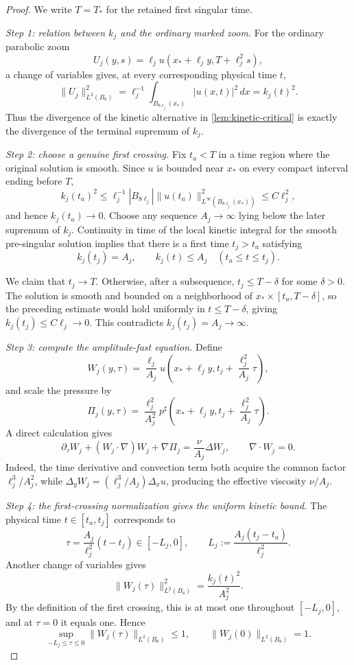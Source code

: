 \documentclass[11pt]{article}
\theoremstyle{definition}\newtheorem{problem}[theorem]{Problem}
\theoremstyle{definition}
\theoremstyle{remark}
\begin{document}
\begin{proof}
We write \(T=T_*\) for the retained first singular time.

\emph{Step 1: relation between \(k_j\) and the ordinary marked zoom.}
For the ordinary parabolic zoom
\[
 U_j(y,s)=\ell_j u(x_*+\ell_jy,T+\ell_j^2s),
\]
a change of variables gives, at every corresponding physical time \(t\),
\[
 \|U_j\|_{L^2(B_8)}^2
 =\ell_j^{-1}
 \int_{B_{8\ell_j}(x_*)}|u(x,t)|^2\,dx
 =k_j(t)^2.
\]
Thus the divergence of the kinetic alternative in
\cref{lem:kinetic-critical} is exactly the divergence of the terminal
supremum of \(k_j\).

\emph{Step 2: choose a genuine first crossing.}
Fix \(t_a<T\) in a time region where the original solution is smooth.  Since
\(u\) is bounded near \(x_*\) on every compact interval ending before \(T\),
\[
 k_j(t_a)^2
 \le \ell_j^{-1}|B_{8\ell_j}|
 \|u(t_a)\|_{L^\infty(B_{8\ell_j}(x_*))}^2
 \le C\ell_j^2,
\]
and hence \(k_j(t_a)\to0\).  Choose any sequence \(A_j\to\infty\) lying below
the later supremum of \(k_j\).  Continuity in time of the local kinetic
integral for the smooth pre-singular solution implies that there is a first
time \(t_j>t_a\) satisfying
\[
 k_j(t_j)=A_j,
 \qquad
 k_j(t)\le A_j\quad(t_a\le t\le t_j).
\]

We claim that \(t_j\to T\).  Otherwise, after a subsequence,
\(t_j\le T-\delta\) for some \(\delta>0\).  The solution is smooth and bounded
on a neighborhood of \(x_*\times[t_a,T-\delta]\), so the preceding estimate
would hold uniformly in \(t\le T-\delta\), giving
\(k_j(t_j)\le C\ell_j\to0\).  This contradicts
\(k_j(t_j)=A_j\to\infty\).

\emph{Step 3: compute the amplitude-fast equation.}
Define
\[
 W_j(y,\tau)
 =\frac{\ell_j}{A_j}
 u\!\left(x_*+\ell_jy,
 t_j+\frac{\ell_j^2}{A_j}\tau\right),
\]
and scale the pressure by
\[
 \Pi_j(y,\tau)
 =\frac{\ell_j^2}{A_j^2}
 p^\sharp\!\left(x_*+\ell_jy,
 t_j+\frac{\ell_j^2}{A_j}\tau\right).
\]
A direct calculation gives
\[
 \partial_\tau W_j+(W_j\cdot\nabla)W_j+\nabla\Pi_j
 =\frac\nu{A_j}\Delta W_j,
 \qquad
 \nabla\cdot W_j=0.
\]
Indeed, the time derivative and convection term both acquire the common factor
\(\ell_j^3/A_j^2\), while
\(\Delta_yW_j=(\ell_j^3/A_j)\Delta_xu\), producing the effective viscosity
\(\nu/A_j\).

\emph{Step 4: the first-crossing normalization gives the uniform kinetic
bound.}
The physical time \(t\in[t_a,t_j]\) corresponds to
\[
 \tau=\frac{A_j}{\ell_j^2}(t-t_j)
 \in[-L_j,0],
 \qquad
 L_j:=\frac{A_j(t_j-t_a)}{\ell_j^2}.
\]
Another change of variables gives
\[
 \|W_j(\tau)\|_{L^2(B_8)}^2
 =\frac{k_j(t)^2}{A_j^2}.
\]
By the definition of the first crossing, this is at most one throughout
\([-L_j,0]\), and at \(\tau=0\) it equals one.  Hence
\[
 \sup_{-L_j\le\tau\le0}\|W_j(\tau)\|_{L^2(B_8)}\le1,
 \qquad
 \|W_j(0)\|_{L^2(B_8)}=1.
\]


\end{proof}
\end{document}
